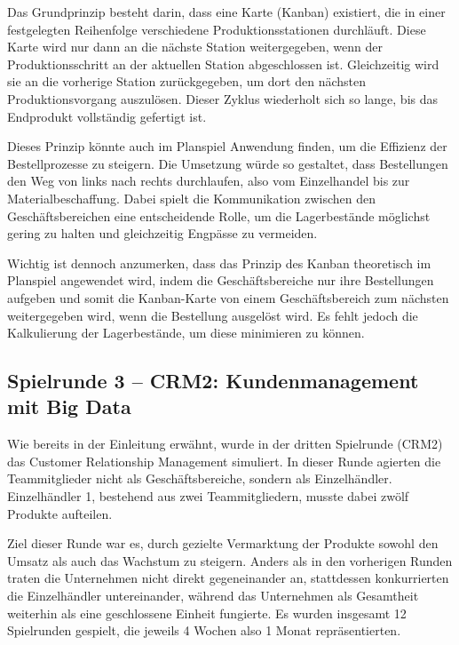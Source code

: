 \documentclass[a4paper,12pt]{article}
\begin{document}
Das Grundprinzip besteht darin, dass eine Karte (Kanban) existiert, die in einer festgelegten Reihenfolge verschiedene Produktionsstationen durchläuft.
Diese Karte wird nur dann an die nächste Station weitergegeben, wenn der Produktionsschritt an der aktuellen Station abgeschlossen ist.
Gleichzeitig wird sie an die vorherige Station zurückgegeben, um dort den nächsten Produktionsvorgang auszulösen.
Dieser Zyklus wiederholt sich so lange, bis das Endprodukt vollständig gefertigt ist. \cite[Kapitel 3.2.2]{Gronwald2020}

Dieses Prinzip könnte auch im Planspiel Anwendung finden, um die Effizienz der Bestellprozesse zu steigern.
Die Umsetzung würde so gestaltet, dass Bestellungen den Weg von links nach rechts durchlaufen, also vom Einzelhandel bis zur Materialbeschaffung.
Dabei spielt die Kommunikation zwischen den Geschäftsbereichen eine entscheidende Rolle,
um die Lagerbestände möglichst gering zu halten und gleichzeitig Engpässe zu vermeiden.

Wichtig ist dennoch anzumerken, dass das Prinzip des Kanban theoretisch im Planspiel angewendet wird,
indem die Geschäftsbereiche nur ihre Bestellungen aufgeben und somit die Kanban-Karte von 
einem Geschäftsbereich zum nächsten weitergegeben wird,
wenn die Bestellung ausgelöst wird. Es fehlt jedoch die Kalkulierung der Lagerbestände, um diese minimieren zu können.

\subsection{Spielrunde 3 – CRM2: Kundenmanagement mit Big Data}
Wie bereits in der Einleitung erwähnt, wurde in der dritten Spielrunde (CRM2) das Customer Relationship Management simuliert.
In dieser Runde agierten die Teammitglieder nicht als Geschäftsbereiche, sondern als Einzelhändler. 
Einzelhändler 1, bestehend aus zwei Teammitgliedern, musste dabei zwölf Produkte aufteilen.

Ziel dieser Runde war es, durch gezielte Vermarktung der Produkte sowohl den Umsatz als auch das Wachstum zu steigern. 
Anders als in den vorherigen Runden traten die Unternehmen nicht direkt gegeneinander an,
stattdessen konkurrierten die Einzelhändler untereinander,
während das Unternehmen als Gesamtheit weiterhin als eine geschlossene Einheit fungierte.
Es wurden insgesamt 12 Spielrunden gespielt, die jeweils 4 Wochen also 1 Monat repräsentierten.
\end{document}
